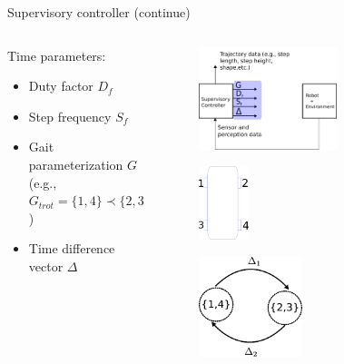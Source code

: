 \documentclass[10pt]{beamer}
\begin{document}
\begin{frame}{Supervisory controller (continue)}
		\begin{columns}
		\hspace{1cm}
		\begin{column}{0.5\textwidth}
		Time parameters:
		\begin{itemize}
			\setlength\itemsep{3em}
			\item Duty factor $D_f$
			\item Step frequency $S_f$
			\item Gait parameterization $G$ (e.g., $G_{trot}=\{1,4\}\prec\{2,3\}$)
			\item Time difference vector $\Delta$
		\end{itemize}	
		
		\end{column}
		\begin{column}{0.5\textwidth}
			\begin{figure}[ht]\centering
				\includegraphics[width=0.6\textwidth]{images/Supervisoryb.pdf}
			\end{figure}
			\vspace{-0.25cm}\begin{figure}[ht]\centering
							\includegraphics[width=0.22\textwidth]{images/Numbers.pdf}
			\end{figure}
			\begin{figure}[ht]\centering
				\includegraphics[width=0.45\textwidth]{images/TrotTime.pdf}
			\end{figure}
		\end{column}
		\end{columns}
\end{frame}
\end{document}
